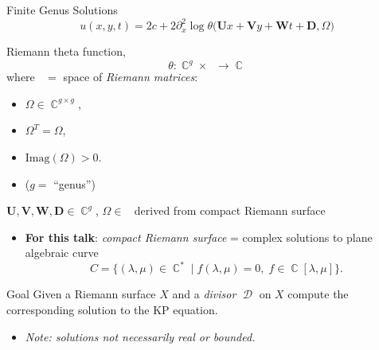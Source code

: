 \documentclass{beamer}
\DeclareMathOperator{\CC}{\mathbb{C}}
\DeclareMathOperator{\hg}{\mathfrak{h}_g}
\DeclareMathOperator{\DivD}{\mathcal{D}}
\begin{document}
\begin{frame}{Finite Genus Solutions}{}
  \[
  u(x,y,t)
  =
  2c + 2 \partial_x^2
  \log \theta
  \Big(
  \boldsymbol{U}x + \boldsymbol{V}y + \boldsymbol{W}t + \boldsymbol{D},
  \Omega
  \Big)
  \]

  \vspace{24pt}
  \pause
  
  \begin{overprint}

    \onslide<+>
    
    Riemann theta function,
    \[
    \theta : \CC^g \times \hg \to \CC
    \]
    where $\hg =$ space of {\it Riemann matrices}:
    \begin{itemize}
    \item $\Omega \in \CC^{g \times g}$,
    \item $\Omega^T = \Omega$,
    \item $\text{Imag}(\Omega) > 0$.
    \item ($g =$ ``genus'')
    \end{itemize}
    
    \onslide<+>

    $\boldsymbol{U},\boldsymbol{V},\boldsymbol{W},\boldsymbol{D}\in\CC^g$,
    $\Omega \in \hg$ derived from compact Riemann surface
    \begin{itemize}
    \item {\bf For this talk}: {\it compact Riemann surface} = complex solutions
      to plane algebraic curve
      \vspace{12pt}
      \[
      C = \big\{ (\lambda,\mu) \in \CC^*
             \; \big| \;
             f(\lambda,\mu) = 0, \; f \in \CC[\lambda,\mu] \big\}.
      \]
    \end{itemize}

    \onslide<+>

    \begin{block}{Goal}
      Given a Riemann surface $X$ and a {\it divisor} $\DivD$ on $X$ compute the
      corresponding solution to the KP equation.
    \end{block}
    \begin{itemize}
    \item {\it Note: solutions not necessarily real or bounded.}
    \end{itemize}
  \end{overprint}
\end{frame}
\end{document}
